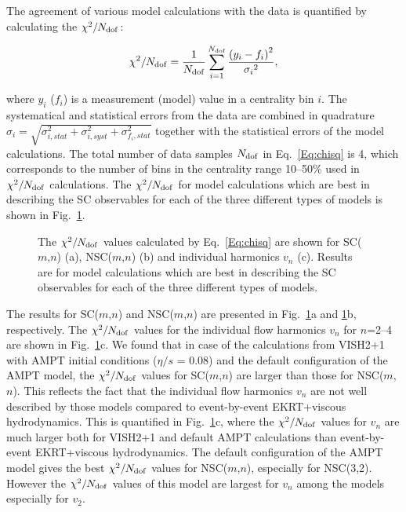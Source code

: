 The agreement of various model calculations with the data is quantified by calculating the $\chi^2/N_{\rm dof}$:

\begin{equation}
\chi^2/N_{\rm dof} = \frac{1}{N_{\rm dof}} \sum_{i=1}^{N_{\rm dof}} \frac{{(y_i-f_i)}^{2}}{{\sigma_i}^{2}},
\label{Eq:chisq}
\end{equation}

where $y_i$ ($f_i$) is a measurement (model) value in a centrality bin $i$. The systematical and statistical errors from the data are combined in quadrature $\sigma_i = \sqrt{\sigma_{i, stat}^2 + \sigma_{i, syst}^2 + \sigma_{f_i, stat}^2}$ together with the statistical errors of the model calculations.
The total number of data samples $N_{\rm dof}$ in Eq.~\ref{Eq:chisq} is 4, which corresponds to the number of bins in the centrality range 10--50\% used in $\chi^2/N_{\rm dof}$ calculations.
The $\chi^2/N_{\rm dof}$ for model calculations which are best in describing the SC observables for each of the three different types of models is shown in Fig.~\ref{fig:Figure_7}.

\begin{figure}[t!]
            \begin{center}
        \caption{The $\chi^2/N_{\rm dof}$ values calculated by Eq.~\ref{Eq:chisq} are shown for SC($m$,$n$) (a), NSC($m$,$n$) (b) and individual harmonics $v_n$ (c). Results are for model calculations which are best in describing the SC observables for each of the three different types of models.}
        \label{fig:Figure_7}
              \end{center}
\end{figure}
The results for SC($m$,$n$) and NSC($m$,$n$) are presented in Fig.~\ref{fig:Figure_7}a and \ref{fig:Figure_7}b, respectively. The $\chi^2/N_{\rm dof}$ values for the individual flow harmonics $v_n$ for $n$=2--4 are shown in Fig.~\ref{fig:Figure_7}c. We found that in case of the calculations from VISH2+1 with AMPT initial conditions ($\eta/s$ = 0.08) and the default configuration of the AMPT model, the $\chi^2/N_{\rm dof}$ values for SC($m$,$n$) are larger than those for NSC($m$,$n$). This reflects the fact that the individual flow harmonics $v_n$ are not well described by those models compared to event-by-event EKRT+viscous hydrodynamics. This is quantified in Fig.~\ref{fig:Figure_7}c, where the $\chi^2/N_{\rm dof}$ values for $v_n$ are much larger both for VISH2+1 and default AMPT calculations than event-by-event EKRT+viscous hydrodynamics.
The default configuration of the AMPT model gives the best $\chi^2/N_{\rm dof}$ values for NSC($m$,$n$), especially for NSC(3,2). However the $\chi^2/N_{\rm dof}$ values of this model are largest for $v_n$ among the models especially for $v_2$.

